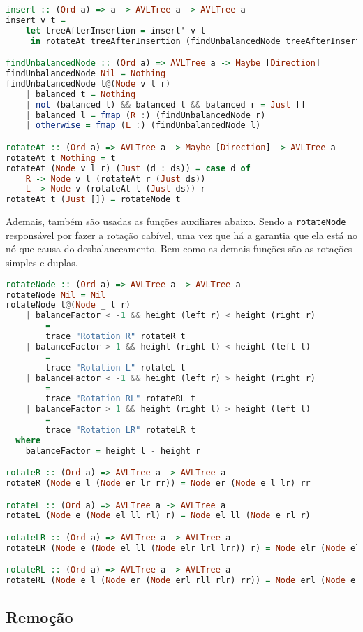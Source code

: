 \begin{lstlisting}[language=haskell]
insert :: (Ord a) => a -> AVLTree a -> AVLTree a
insert v t =
    let treeAfterInsertion = insert' v t
     in rotateAt treeAfterInsertion (findUnbalancedNode treeAfterInsertion)

findUnbalancedNode :: (Ord a) => AVLTree a -> Maybe [Direction]
findUnbalancedNode Nil = Nothing
findUnbalancedNode t@(Node v l r)
    | balanced t = Nothing
    | not (balanced t) && balanced l && balanced r = Just []
    | balanced l = fmap (R :) (findUnbalancedNode r)
    | otherwise = fmap (L :) (findUnbalancedNode l)

rotateAt :: (Ord a) => AVLTree a -> Maybe [Direction] -> AVLTree a
rotateAt t Nothing = t
rotateAt (Node v l r) (Just (d : ds)) = case d of
    R -> Node v l (rotateAt r (Just ds))
    L -> Node v (rotateAt l (Just ds)) r
rotateAt t (Just []) = rotateNode t
\end{lstlisting}

Ademais, também são usadas as funções auxiliares abaixo. Sendo a \texttt{rotateNode} responsável por fazer a rotação cabível, uma vez que há a garantia que ela está no nó que causa do desbalanceamento. Bem como as demais funções são as rotações simples e duplas.

\begin{lstlisting}[language=haskell]
rotateNode :: (Ord a) => AVLTree a -> AVLTree a
rotateNode Nil = Nil
rotateNode t@(Node _ l r)
    | balanceFactor < -1 && height (left r) < height (right r)
        =
        trace "Rotation R" rotateR t
    | balanceFactor > 1 && height (right l) < height (left l)
        =
        trace "Rotation L" rotateL t
    | balanceFactor < -1 && height (left r) > height (right r)
        =
        trace "Rotation RL" rotateRL t
    | balanceFactor > 1 && height (right l) > height (left l)
        =
        trace "Rotation LR" rotateLR t
  where
    balanceFactor = height l - height r

rotateR :: (Ord a) => AVLTree a -> AVLTree a
rotateR (Node e l (Node er lr rr)) = Node er (Node e l lr) rr

rotateL :: (Ord a) => AVLTree a -> AVLTree a
rotateL (Node e (Node el ll rl) r) = Node el ll (Node e rl r)

rotateLR :: (Ord a) => AVLTree a -> AVLTree a
rotateLR (Node e (Node el ll (Node elr lrl lrr)) r) = Node elr (Node el ll lrl) (Node e lrr r)

rotateRL :: (Ord a) => AVLTree a -> AVLTree a
rotateRL (Node e l (Node er (Node erl rll rlr) rr)) = Node erl (Node e l rll) (Node er rlr rr)
\end{lstlisting}
\subsection{Remoção}
